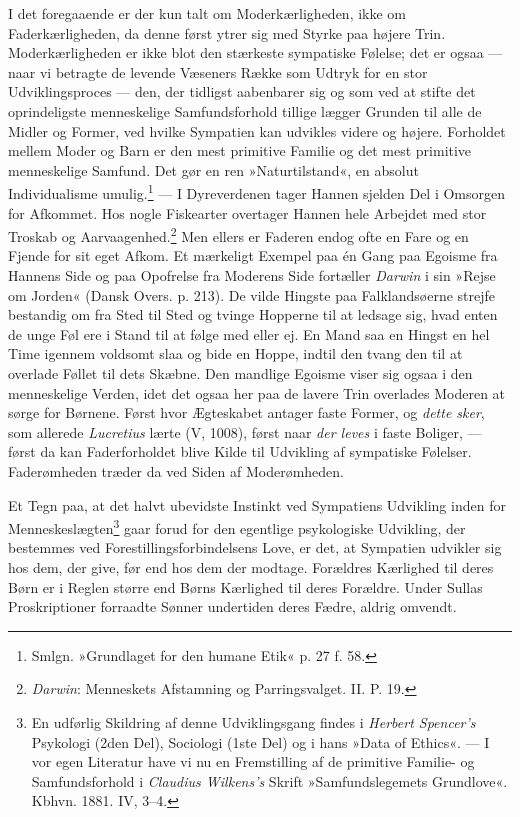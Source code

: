 \documentclass[12pt,a4paper,openany]{book}
\newcommand{\opage}[1]{\marginnote{\footnotesize\textit{[#1]}}}
\begin{document}
I det foregaaende er der kun talt om Moderkærligheden, ikke om
Faderkærligheden, da denne først ytrer sig med Styrke paa højere Trin.
Moderkærligheden er ikke blot den stærkeste sympatiske Følelse; det er
ogsaa --- naar vi betragte de levende Væseners Række som Udtryk for en
stor Udviklingsproces --- den, der tidligst aabenbarer sig og som ved at
stifte det oprindeligste menneskelige Samfundsforhold tillige lægger
Grunden til alle de Midler og Former, ved hvilke Sympatien kan udvikles
videre og højere. Forholdet mellem Moder og Barn er den mest primitive
Familie og det mest primitive menneskelige Samfund. Det gør en ren
»Naturtilstand«, en absolut Individualisme umulig.\footnote[1]{Smlgn.
»Grundlaget for den humane Etik« p. 27 f. 58.} --- I Dyreverdenen tager
Hannen sjelden Del i Omsorgen for Afkommet. Hos nogle Fiskearter
overtager Hannen hele Arbejdet med stor Troskab og
Aarvaagenhed.\footnote[2]{\emph{Darwin}: Menneskets Afstamning og
Parringsvalget. II. P. 19.} Men ellers er Faderen endog ofte en Fare og
en Fjende for sit eget Afkom. Et mærkeligt Exempel paa én Gang paa
Egoisme fra Hannens Side og paa Opofrelse fra Moderens Side fortæller
\emph{Darwin} i sin »Rejse om Jorden« (Dansk Overs. p. 213). De vilde
Hingste paa Falklandsøerne strejfe bestandig om fra Sted til Sted og
tvinge Hopperne til at ledsage sig, hvad enten de unge Føl ere i Stand
til at
\opage{300}følge med eller ej. En Mand saa en Hingst en hel Time igennem
voldsomt slaa og bide en Hoppe, indtil den tvang den til at overlade
Føllet til dets Skæbne. Den mandlige Egoisme viser sig ogsaa i den
menneskelige Verden, idet det ogsaa her paa de lavere Trin overlades
Moderen at sørge for Børnene. Først hvor Ægteskabet antager faste
Former, og \emph{dette sker}, som allerede \emph{Lucretius} lærte (V,
1008), først naar \emph{der leves} i faste Boliger, --- først da kan
Faderforholdet blive Kilde til Udvikling af sympatiske Følelser.
Faderømheden træder da ved Siden af Moderømheden.

Et Tegn paa, at det halvt ubevidste Instinkt ved Sympatiens Udvikling
inden for Menneskeslægten\footnote[1]{En udførlig Skildring af denne
Udviklingsgang findes i \emph{Herbert Spencer’s} Psykologi (2den Del),
Sociologi (1ste Del) og i hans »Data of Ethics«. --- I vor egen
Literatur have vi nu en Fremstilling af de primitive Familie- og
Samfundsforhold i \emph{Claudius Wilkens’s} Skrift »Samfundslegemets
Grundlove«. Kbhvn. 1881. IV, 3--4.} gaar forud for den egentlige
psykologiske Udvikling, der bestemmes ved Forestillingsforbindelsens
Love, er det, at Sympatien udvikler sig hos dem, der give, før end hos
dem der modtage. Forældres Kærlighed til deres Børn er i Reglen større
end Børns Kærlighed til deres Forældre. Under Sullas Proskriptioner
forraadte Sønner undertiden deres Fædre, aldrig omvendt.
\end{document}
